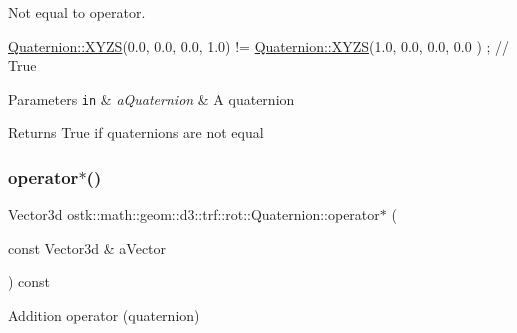 Not equal to operator. 


\begin{DoxyCode}
\hyperlink{classostk_1_1math_1_1geom_1_1d3_1_1trf_1_1rot_1_1_quaternion_ac57ea57a4033622ed1389101b2e58c76}{Quaternion::XYZS}(0.0, 0.0, 0.0, 1.0) != \hyperlink{classostk_1_1math_1_1geom_1_1d3_1_1trf_1_1rot_1_1_quaternion_ac57ea57a4033622ed1389101b2e58c76}{Quaternion::XYZS}(1.0, 0.0, 0.0, 0.0
      ) ; \textcolor{comment}{// True}
\end{DoxyCode}



\begin{DoxyParams}[1]{Parameters}
\mbox{\tt in}  & {\em a\+Quaternion} & A quaternion \\
\hline
\end{DoxyParams}
\begin{DoxyReturn}{Returns}
True if quaternions are not equal 
\end{DoxyReturn}
\mbox{\label{classostk_1_1math_1_1geom_1_1d3_1_1trf_1_1rot_1_1_quaternion_a26bf54c393d70c812538b119d4cb10a3}} 
\subsubsection{\texorpdfstring{operator$\ast$()}{operator*()}\hspace{0.1cm}{\footnotesize\ttfamily [1/2]}}
{\footnotesize\ttfamily Vector3d ostk\+::math\+::geom\+::d3\+::trf\+::rot\+::\+Quaternion\+::operator$\ast$ (\begin{DoxyParamCaption}\item[{const Vector3d \&}]{a\+Vector }\end{DoxyParamCaption}) const}



Addition operator (quaternion) 


